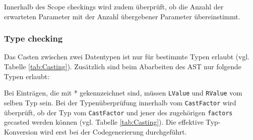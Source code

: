 \documentclass[10pt, a4paper, twocolumn]{article} %
\begin{document}
Innerhalb des Scope checkings wird zudem überprüft, ob die Anzahl der erwarteten Parameter mit der Anzahl übergebener Parameter übereinstimmt.

\subsubsection*{Type checking}
Das Casten zwischen zwei Datentypen ist nur für bestimmte Typen erlaubt (vgl. Tabelle \ref{tab:Casting}).
Zusätzlich sind beim Abarbeiten des AST nur folgende Typen erlaubt:

\begin{table}[h]
    \centering
    \tiny
    \caption{Erlaubte Typen im AST}
    \label{tab:types}
\end{table}
Bei Einträgen, die mit * gekennzeichnet sind, müssen \texttt{LValue} und \texttt{RValue} vom selben Typ sein.
Bei der Typenüberprüfung innerhalb vom \texttt{CastFactor} wird überprüft, ob der Typ vom \texttt{CastFactor} und jener des zugehörigen \texttt{factors} gecasted werden können (vgl. Tabelle \ref{tab:Casting}).
Die effektive Typ-Konversion wird erst bei der Codegenerierung durchgeführt.
\end{document}
